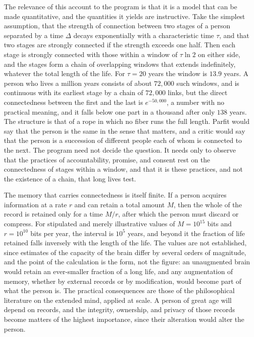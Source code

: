 The relevance of this account to the program is that it is a model that can be made quantitative, and the quantities it yields are instructive. Take the simplest assumption, that the strength of connection between two stages of a person separated by a time $\Delta$ decays exponentially with a characteristic time $\tau$, and that two stages are strongly connected if the strength exceeds one half. Then each stage is strongly connected with those within a window of $\tau\ln2$ on either side, and the stages form a chain of overlapping windows that extends indefinitely, whatever the total length of the life. For $\tau=20$ years the window is $13.9$ years. A person who lives a million years consists of about $72{,}000$ such windows, and is continuous with its earliest stage by a chain of $72{,}000$ links, but the direct connectedness between the first and the last is $e^{-50{,}000}$, a number with no practical meaning, and it falls below one part in a thousand after only $138$ years. The structure is that of a rope in which no fiber runs the full length. Parfit would say that the person is the same in the sense that matters, and a critic would say that the person is a succession of different people each of whom is connected to the next. The program need not decide the question. It needs only to observe that the practices of accountability, promise, and consent rest on the connectedness of stages within a window, and that it is these practices, and not the existence of a chain, that long lives test.

The memory that carries connectedness is itself finite. If a person acquires information at a rate $r$ and can retain a total amount $M$, then the whole of the record is retained only for a time $M/r$, after which the person must discard or compress. For stipulated and merely illustrative values of $M=10^{15}$ bits and $r=10^{10}$ bits per year, the interval is $10^5$ years, and beyond it the fraction of life retained falls inversely with the length of the life. The values are not established, since estimates of the capacity of the brain differ by several orders of magnitude, and the point of the calculation is the form, not the figure: an unaugmented brain would retain an ever-smaller fraction of a long life, and any augmentation of memory, whether by external records or by modification, would become part of what the person is. The practical consequences are those of the philosophical literature on the extended mind, applied at scale. A person of great age will depend on records, and the integrity, ownership, and privacy of those records become matters of the highest importance, since their alteration would alter the person.

